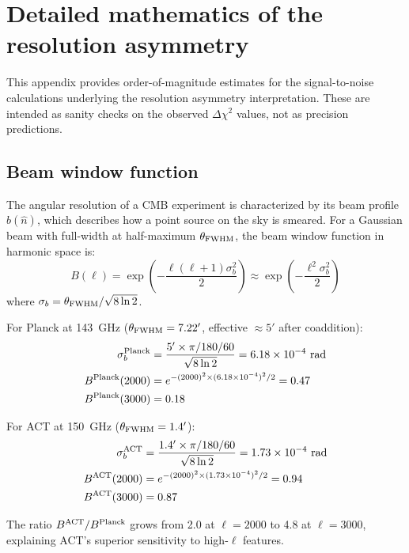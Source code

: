 \documentclass[onecolumn,showpacs,preprintnumbers,amsmath,amssymb,prd]{revtex4-2}
\begin{document}
\section{Detailed mathematics of the resolution asymmetry}
\label{app:math}

This appendix provides order-of-magnitude estimates for the signal-to-noise 
calculations underlying the resolution asymmetry interpretation. These are 
intended as sanity checks on the observed $\Delta\chi^2$ values, not as 
precision predictions.

\subsection{Beam window function}

The angular resolution of a CMB experiment is characterized by its beam profile 
$b(\hat n)$, which describes how a point source on the sky is smeared. For a 
Gaussian beam with full-width at half-maximum $\theta_{\rm FWHM}$, the beam 
window function in harmonic space is:
\begin{equation}
B(\ell) = \exp\left(-\frac{\ell(\ell+1)\sigma_b^2}{2}\right) 
\approx \exp\left(-\frac{\ell^2\sigma_b^2}{2}\right)
\end{equation}
where $\sigma_b = \theta_{\rm FWHM}/\sqrt{8\ln 2}$.

For Planck at 143~GHz ($\theta_{\rm FWHM} = 7.22'$, effective $\approx 5'$ 
after coaddition):
\begin{align}
\sigma_b^{\rm Planck} &= \frac{5' \times \pi/180/60}{\sqrt{8\ln 2}} 
= 6.18 \times 10^{-4}~\text{rad} \\
B^{\rm Planck}(2000) &= e^{-(2000)^2 \times (6.18\times 10^{-4})^2/2} = 0.47 \\
B^{\rm Planck}(3000) &= 0.18
\end{align}

For ACT at 150~GHz ($\theta_{\rm FWHM} = 1.4'$):
\begin{align}
\sigma_b^{\rm ACT} &= \frac{1.4' \times \pi/180/60}{\sqrt{8\ln 2}} 
= 1.73 \times 10^{-4}~\text{rad} \\
B^{\rm ACT}(2000) &= e^{-(2000)^2 \times (1.73\times 10^{-4})^2/2} = 0.94 \\
B^{\rm ACT}(3000) &= 0.87
\end{align}

The ratio $B^{\rm ACT}/B^{\rm Planck}$ grows from 2.0 at $\ell = 2000$ to 4.8 
at $\ell = 3000$, explaining ACT's superior sensitivity to high-$\ell$ features.
\end{document}
